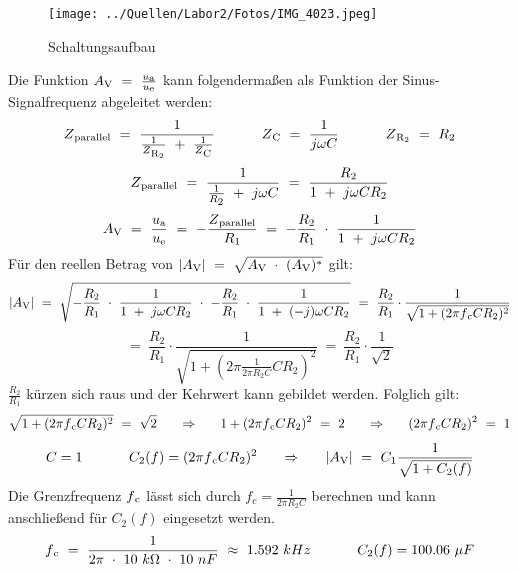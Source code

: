 \documentclass[a4paper,12pt]{article}
\begin{document}
\begin{figure}[H]
    \centering
    \texttt{[image: ../Quellen/Labor2/Fotos/IMG\_4023.jpeg]}
\caption{Schaltungsaufbau}
\end{figure}
\noindent Die Funktion \(A\textsubscript{V}~=~\frac{u\textsubscript{a}}{u\textsubscript{e}}\) kann folgendermaßen als Funktion der Sinus-Signalfrequenz abgeleitet werden:
\[
Z\textsubscript{parallel}~=~\frac{1}{\frac{1}{Z\textsubscript{R\textsubscript{2}}}~+~\frac{1}{Z\textsubscript{C}}}~~~~~~~~~~Z\textsubscript{C}~=~\frac{1}{j\omega C}~~~~~~~~~~Z\textsubscript{R\textsubscript{2}}~=~R\textsubscript{2}
\]
\[
Z\textsubscript{parallel}~=~\frac{1}{\frac{1}{R\textsubscript{2}}~+~j\omega C}~=~\frac{R\textsubscript{2}}{1~+~j\omega CR\textsubscript{2}}
\]
\[
A\textsubscript{V}~=~\frac{u\textsubscript{a}}{u\textsubscript{e}}~=~-\frac{Z\textsubscript{parallel}}{R_1}~=~-\frac{R_2}{R_1}~\cdot~\frac{1}{1~+~j\omega CR\textsubscript{2}}
\]
\noindent Für den reellen Betrag von \(\left\lvert A\textsubscript{V}\right\rvert~=~\sqrt{A\textsubscript{V}~\cdot~(A\textsubscript{V})^*}\) gilt:
\[
\left\lvert A\textsubscript{V}\right\rvert~=~\sqrt{-\frac{R_2}{R_1}~\cdot~\frac{1}{1~+~j\omega CR\textsubscript{2}}~\cdot~-\frac{R_2}{R_1}~\cdot~\frac{1}{1~+~(-j)\omega CR\textsubscript{2}}}~=~\frac{R_2}{R_1}\cdot\frac{1}{\sqrt{1+(2\pi f\textsubscript{c} CR_2)^2}}
\]
\[
=~\frac{R_2}{R_1}\cdot\frac{1}{\sqrt{1+(2\pi \frac{1}{2\pi R_2C} CR_2)^2}}~=~\frac{R_2}{R_1}\cdot\frac{1}{\sqrt{2}}
\]
\noindent \(\frac{R_2}{R_1}\) kürzen sich raus und der Kehrwert kann gebildet werden. Folglich gilt:
\[
\sqrt{1+(2\pi f\textsubscript{c} CR_2)^2}~=~\sqrt{2}~~~~~\Rightarrow~~~~~1+(2\pi f\textsubscript{c}CR_2)^2~=~2~~~~~\Rightarrow~~~~~(2\pi f\textsubscript{c}CR_2)^2~=~1
\]
\[
C=1~~~~~~~~~~C_2(f)=(2\pi f\textsubscript{c}CR_2)^2~~~~~\Rightarrow~~~~~\left\lvert A\textsubscript{V}\right\rvert~=~C_1 \frac{1}{\sqrt{1+C_2(f)}}
\]
\noindent Die Grenzfrequenz \(f\textsubscript{c}\) lässt sich durch \(f_c = \frac{1}{2 \pi R_2 C}\) berechnen und kann anschließend für \(C_2(f)\) eingesetzt werden.
\[
f\textsubscript{c}~=~\frac{1}{2 \pi~\cdot~10~k\Omega~\cdot~10~nF}~\approx~1.592~kHz~~~~~~~~~~C_2(f)=100.06~\mu F
\]
\end{document}
